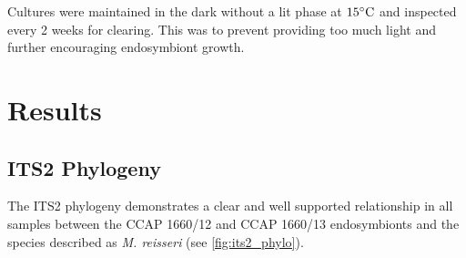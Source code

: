 Cultures were maintained in the dark without a lit phase
at \(15\celsius\) and inspected every 2 weeks for clearing.
This was to prevent providing too much light and 
further encouraging endosymbiont growth. 

\section{Results}

\subsection{ITS2 Phylogeny}

The ITS2 phylogeny demonstrates a clear and well supported relationship in all samples 
between the CCAP 1660/12 and CCAP 1660/13 endosymbionts and the species described as 
\textit{M. reisseri} (see \cref{fig:its2_phylo}).

